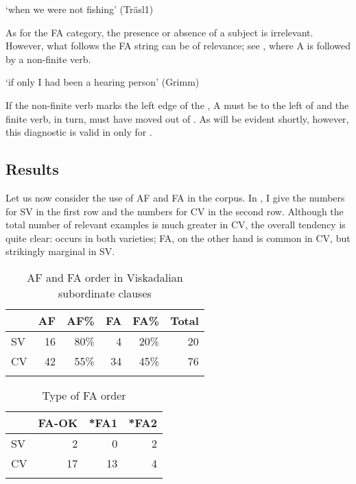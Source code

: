 \documentclass[output=paper,colorlinks,citecolor=brown,draft,draftmode]{langscibook}
\begin{document}
\glt `when we were not fishing’ (Träsl1)
\z

As for the FA category, the presence or absence of a subject is irrelevant. However, what follows the FA string can be of relevance; see , where A is followed by a non-finite verb.


\glt `if only I had been a hearing person’ (Grimm)
\z


If the non-finite verb marks the left edge of the , A must be to the left of  and the finite verb, in turn, must have moved out of . As will be evident shortly, however, this diagnostic is valid in  only for .


\subsection{Results}\label{sec:petzell:2.4}


Let us now consider the use of AF and FA in the corpus. In , I give the numbers for SV in the first row and the numbers for CV in the second row. Although the total number of relevant examples is much greater in CV, the overall tendency is quite clear:  occurs in both varieties; FA, on the other hand is common in CV, but strikingly marginal in SV.


\begin{table}
\begin{tabular}{lrrrrr}
\lsptoprule
& AF & AF\% & FA & FA\% & Total\\\midrule
SV & 16 & 80\% & 4 & 20\% & 20\\
CV & 42 & 55\% & 34 & 45\% & 76\\
\lspbottomrule
\end{tabular}
\caption{\label{tab:petzell:1a}AF and FA order in Viskadalian subordinate clauses}
\end{table}

\begin{table}
\caption{\label{tab:petzell:1b}Type of FA order}
\begin{tabular}{lrrr}
\lsptoprule
& FA-OK & *FA1 & *FA2\\\midrule
SV & 2 & 0 & 2\\
CV & 17 & 13 & 4\\
\lspbottomrule
\end{tabular}
\end{table}
\end{document}
